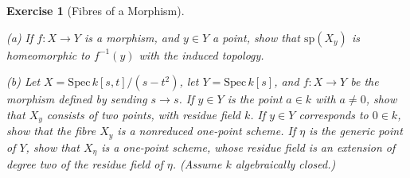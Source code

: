 \documentclass[12pt]{amsart}
\newtheorem{exe}{Exercise}[subsection]
\begin{document}
\begin{exe}[Fibres of a Morphism]
	\ 
	
	(a) If $f: X\rightarrow Y$ is a morphism, and $y\in Y$ a point, show that $\mathrm{sp}(X_y)$ is homeomorphic to $f^{-1}(y)$
	with the induced topology.
	
	(b) Let $X=\mathrm{Spec}\,k[s,t]/(s-t^2)$, let $Y=\mathrm{Spec}\,k[s]$, and $f:X\to Y$ be the morphism defined by sending $s\to s$. If $y\in Y$ is the point $a\in k$ with $a\neq0$, show that $X_y$ consists of two points, with residue field $k$. If $y\in Y$ corresponds to $0\in k$, show that the fibre $X_y$ is a nonreduced one-point scheme. If $\eta$ is the generic point of $Y$, show that $X_\eta$ is a one-point scheme, whose residue field is an extension of degree two of the residue field of $\eta$. (Assume $k$ algebraically closed.)
\end{exe}
\end{document}
